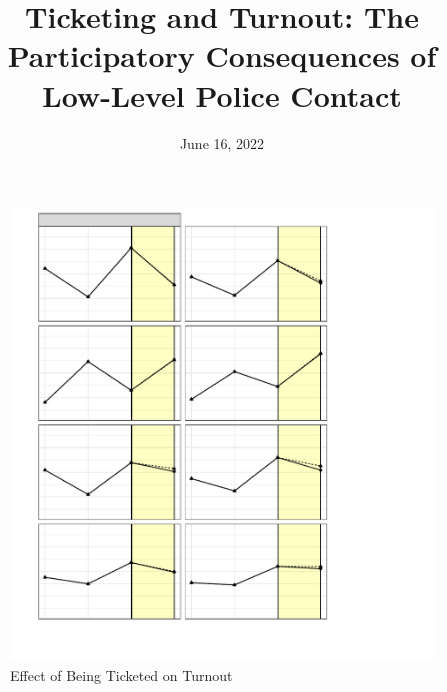 \documentclass[
  12pt,
]{article}
\title{Ticketing and Turnout: The Participatory Consequences of Low-Level Police Contact}
\author{}
\date{\vspace{-2.5em}June 16, 2022}
\begin{document}
\maketitle

\pagebreak

\doublespacing

\begin{figure}[H]

{\centering \includegraphics{compile_files/figure-latex/did-primary-1} 

}

\caption{\label{fig:did-1}Effect of Being Ticketed on Turnout}\label{fig:did-primary}
\end{figure}
\end{document}
